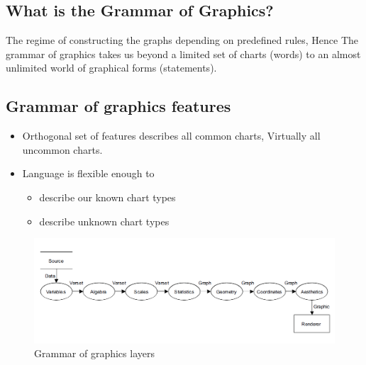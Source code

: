 \documentclass[12pt]{article}
\begin{document}
\subsection{What is the Grammar of Graphics?}
The regime of constructing the graphs depending on predefined rules, Hence 
The grammar of graphics takes us beyond a limited set of charts (words) to an almost unlimited world of graphical forms (statements).
\subsection{Grammar of graphics features}
\begin{itemize}
\item Orthogonal set of features describes all common charts, Virtually all uncommon charts.
\item Language is flexible enough to
\begin{itemize}
\item describe our known chart types
\item describe unknown chart types
\end{itemize}
\end{itemize}
\begin{figure}[h!]
\caption{Grammar of graphics layers}
\includegraphics[width=\textwidth]{pre9}
\end{figure}
\newpage
\end{document}
